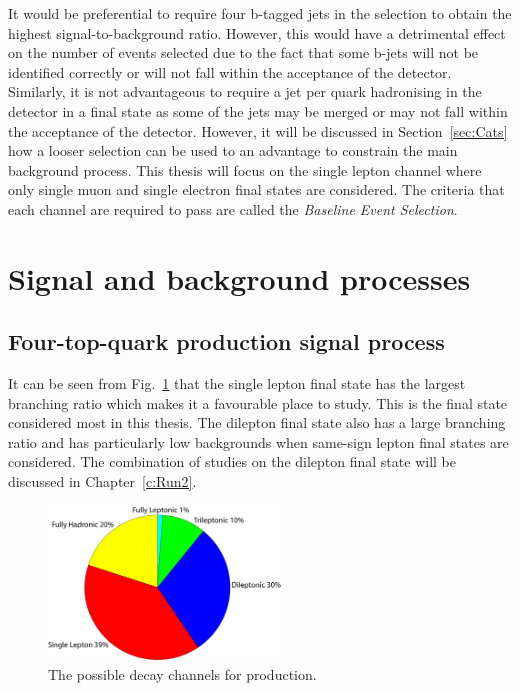 It would be preferential to require four b-tagged jets in the selection to obtain the highest signal-to-background ratio. However, this would have a detrimental effect on the number of \tttt events selected due to the fact that some b-jets will not be identified correctly or will not fall within the acceptance of the detector. Similarly, it is not advantageous to require a jet per quark hadronising in the detector in a \tttt final state as some of the jets may be merged or may not fall within the acceptance of the detector. However, it will be discussed in Section~\ref{sec:Cats} how a looser selection can be used to an advantage to constrain the main background process.
This thesis will focus on the single lepton channel where only single muon and single electron final states are considered. 
The criteria that each channel are required to pass are called the \emph{Baseline Event Selection}.

\section{Signal and background processes}
\label{sec:sigback}

\subsection{Four-top-quark production signal process}
It can be seen from Fig.~\ref{fig:ttttDecay} that the single lepton final state has the largest branching ratio which makes it a favourable place to study. This is the final state considered most in this thesis. The dilepton final state also has a large branching ratio and has particularly low backgrounds when same-sign lepton final states are considered. The combination of studies on the dilepton final state will be discussed in Chapter~\ref{c:Run2}.

\begin{figure}[ht!]
\centering
    \includegraphics[width=0.55\textwidth]{images/Analysis/FourTopBR.pdf}
    \caption{The possible decay channels for \tttt production.}
    \label{fig:ttttDecay}
\end{figure}

